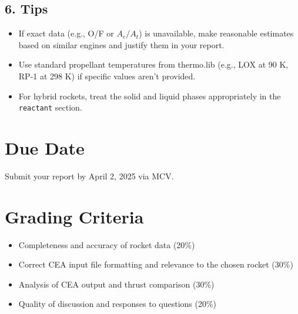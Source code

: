 \documentclass[12pt]{article}
\begin{document}
\subsection{6. Tips}
\begin{itemize}
    \item If exact data (e.g., O/F or $A_e/A_t$) is unavailable, make reasonable estimates based on similar engines and justify them in your report.
    \item Use standard propellant temperatures from thermo.lib (e.g., LOX at 90 K, RP-1 at 298 K) if specific values aren't provided.
    \item For hybrid rockets, treat the solid and liquid phases appropriately in the \texttt{reactant} section.
\end{itemize}

\section{Due Date}
Submit your report by April 2, 2025 via MCV.

\section{Grading Criteria}
\begin{itemize}
    \item Completeness and accuracy of rocket data (20\%)
    \item Correct CEA input file formatting and relevance to the chosen rocket (30\%)
    \item Analysis of CEA output and thrust comparison (30\%)
    \item Quality of discussion and responses to questions (20\%)
\end{itemize}
\end{document}
